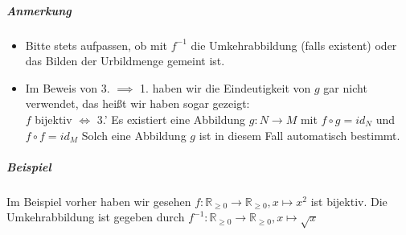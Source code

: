 \documentclass[a4paper]{scrartcl}
\theoremstyle{definition}
\theoremstyle{plain}
\theoremstyle{plain}
\theoremstyle{remark}
\theoremstyle{remark}
\theoremstyle{remark}
\theoremstyle{remark}
\theoremstyle{remark}
\begin{document}
\subparagraph{Anmerkung}
\label{sec-2-6-7-6-2}
\begin{itemize}
\item Bitte stets aufpassen, ob mit $f^{-1}$ die Umkehrabbildung (falls existent) oder das Bilden der Urbildmenge gemeint ist.
\item Im Beweis von 3. $\implies$ 1. haben wir die Eindeutigkeit von $g$ gar nicht verwendet, das heißt wir haben sogar gezeigt: \\
                $f$ bijektiv $\iff$ 3.' Es existiert eine Abbildung $g:N\to M$ mit $f\circ g = id_N$ und $f\circ f = id_M$ Solch eine Abbildung $g$ ist in diesem Fall automatisch bestimmt.
\end{itemize}
\subparagraph{Beispiel}
\label{sec-2-6-7-6-3}
Im Beispiel vorher haben wir gesehen $f:\mathbb{R}_{\geq 0} \to \mathbb{R}_{\geq 0}, x\mapsto x^2$ ist bijektiv.
Die Umkehrabbildung ist gegeben durch $f^{-1}:\mathbb{R}_{\geq 0} \to \mathbb{R}_{\geq 0}, x\mapsto \sqrt{x}$
\end{document}
